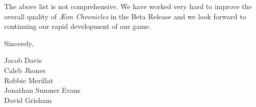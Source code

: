 \documentclass[12pt]{article}
\newcommand\aeon{\textit{\AE on Chronicles}\xspace}
\newcommand\tab[1][.5in]{\hspace*{#1}}
\newcommand\releasename{Beta Release\xspace}
\begin{document}
The above list is not comprehensive. We have worked very hard to improve the
overall quality of \aeon in the \releasename and we look forward to continuing
our rapid development of our game.

Sincerely,

\tab Jacob Davis \\
\tab Caleb Jhones \\
\tab Robbie Merillat \\
\tab Jonathan Sumner Evans \\
\tab David Grisham \\
\end{document}
